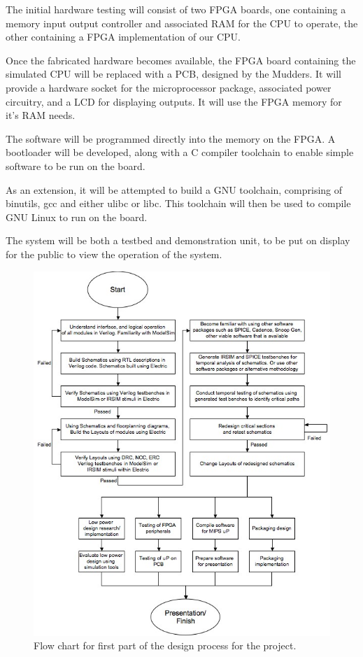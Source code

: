 The initial hardware testing will consist of two FPGA boards, one containing a memory input output controller and associated RAM for the CPU to operate, the other containing a FPGA implementation of our CPU.

Once the fabricated hardware becomes available, the FPGA board containing the simulated CPU will be replaced with a PCB, designed by the Mudders. It will provide a hardware socket for the microprocessor package, associated power circuitry, and a LCD for displaying outputs. It will use the FPGA memory for it's RAM needs.

The software will be programmed directly into the memory on the FPGA. A bootloader will be developed, along with a C compiler toolchain to enable simple software to be run on the board.

As an extension, it will be attempted to build a GNU toolchain, comprising of binutils, gcc and either ulibc or libc. This toolchain will then be used to compile GNU Linux to run on the board.

The system will be both a testbed and demonstration unit, to be put on display for the public to view the operation of the system.

\begin{figure}
\centering 
\includegraphics[width=\textwidth]{designflowALL.jpg}
\caption{Flow chart for first part of the design process for the project.}
\label{designflowALL}
\end{figure}

